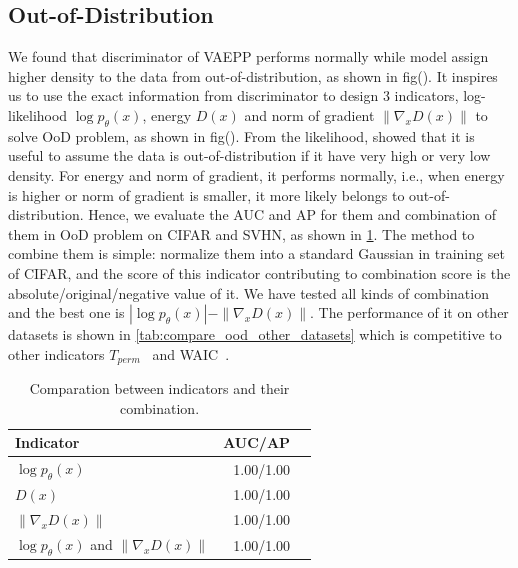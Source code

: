 \subsection{Out-of-Distribution}

We found that discriminator of VAEPP performs normally while model assign higher density to the data from out-of-distribution, as shown in fig(). It inspires us to use the exact information from discriminator to design 3 indicators, log-likelihood $\log p_\theta(x)$, energy $D(x)$ and norm of gradient $\|\nabla_{x} D(x)\|$ to solve OoD problem, as shown in fig(). From the likelihood, \cite{song2017pixeldefend} showed that it is useful to assume the data is out-of-distribution if it have very high or very low density. For energy and norm of gradient, it performs normally, i.e., when energy is higher or norm of gradient is smaller, it more likely belongs to out-of-distribution. Hence, we evaluate the AUC and AP for them and combination of them in OoD problem on CIFAR and SVHN, as shown in \cref{tab:compare_ood}. The method to combine them is simple: normalize them into a standard Gaussian in training set of CIFAR, and the score of this indicator contributing to combination score is the absolute/original/negative value of it. We have tested all kinds of combination and the best one is $|\log p_\theta(x)| - \|\nabla_x D(x)\|$. The performance of it on other datasets is shown in \cref{tab:compare_ood_other_datasets} which is competitive to other indicators $T_{perm}$~\cite{song2017pixeldefend} and WAIC~\cite{choi2018waic}. 
\begin{table}[tb]
\centering
\begin{tabular}{lrr}  
\toprule
Indicator  & AUC/AP \\
\midrule
$\log p_\theta(x)$   &  1.00/1.00      \\
$D(x)$               &  1.00/1.00      \\
$\|\nabla_x D(x)\|$  &  1.00/1.00      \\
$\log p_\theta(x)$ and $\|\nabla_x D(x)\|$ & 1.00/1.00 \\
\bottomrule
\end{tabular}
\caption{Comparation between indicators and their combination.}
\label{tab:compare_ood}
\end{table}
